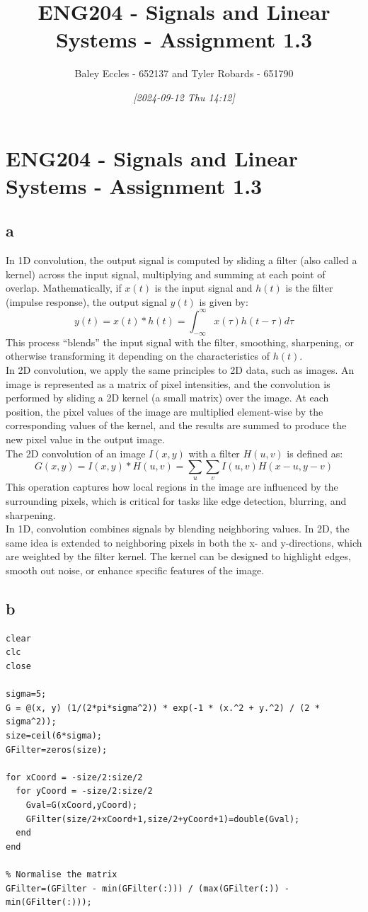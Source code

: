 \documentclass[11pt]{article}
\author{Baley Eccles - 652137 and Tyler Robards - 651790}
\date{\textit{{[}2024-09-12 Thu 14:12]}}
\title{ENG204 - Signals and Linear Systems - Assignment 1.3}
\begin{document}
\maketitle
\tableofcontents

\section{ENG204 - Signals and Linear Systems - Assignment 1.3}
\label{sec:org10174dd}
\subsection{a}
\label{sec:org9f58d4f}
In 1D convolution, the output signal is computed by sliding a filter (also called a kernel) across the input signal, multiplying and summing at each point of overlap. Mathematically, if \(x(t)\) is the input signal and \(h(t)\) is the filter (impulse response), the output signal \(y(t)\) is given by:
\[y(t)=x(t)*h(t)=\int_{-\infty}^{\infty}x(\tau)h(t-\tau)d\tau\]
This process ``blends'' the input signal with the filter, smoothing, sharpening, or otherwise transforming it depending on the characteristics of \(h(t)\). \\
In 2D convolution, we apply the same principles to 2D data, such as images. An image is represented as a matrix of pixel intensities, and the convolution is performed by sliding a 2D kernel (a small matrix) over the image. At each position, the pixel values of the image are multiplied element-wise by the corresponding values of the kernel, and the results are summed to produce the new pixel value in the output image.\\
The 2D convolution of an image \(I(x,y)\) with a filter \(H(u,v)\) is defined as:
\[G(x,y)=I(x,y)*H(u,v)=\sum_u\sum_vI(u,v)H(x-u,y-v)\]
This operation captures how local regions in the image are influenced by the surrounding pixels, which is critical for tasks like edge detection, blurring, and sharpening.\\
In 1D, convolution combines signals by blending neighboring values. In 2D, the same idea is extended to neighboring pixels in both the x- and y-directions, which are weighted by the filter kernel. The kernel can be designed to highlight edges, smooth out noise, or enhance specific features of the image.
\subsection{b}
\label{sec:org2d9b5e1}
\begin{verbatim}
clear
clc
close

sigma=5;
G = @(x, y) (1/(2*pi*sigma^2)) * exp(-1 * (x.^2 + y.^2) / (2 * sigma^2));
size=ceil(6*sigma);
GFilter=zeros(size);

for xCoord = -size/2:size/2
  for yCoord = -size/2:size/2
    Gval=G(xCoord,yCoord);
    GFilter(size/2+xCoord+1,size/2+yCoord+1)=double(Gval);
  end
end

% Normalise the matrix
GFilter=(GFilter - min(GFilter(:))) / (max(GFilter(:)) - min(GFilter(:)));

\end{verbatim}
\end{document}
